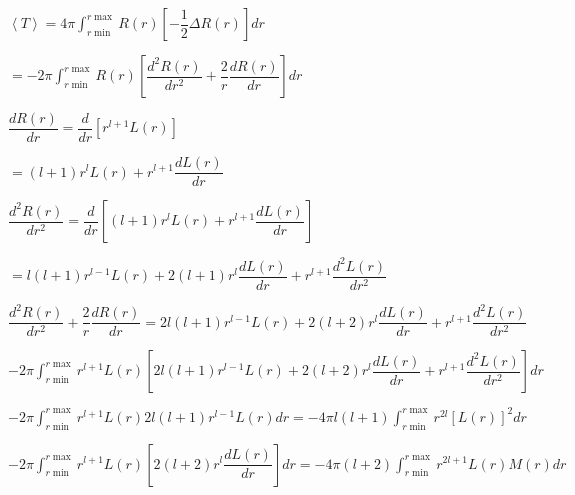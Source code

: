 \documentclass{jarticle}%
\begin{document}
$\left\langle T\right\rangle =4\pi%
{\displaystyle\int\nolimits_{r\min}^{r\max}}
R\left(  r\right)  \left[  -\dfrac{1}{2}\Delta R\left(  r\right)  \right]  dr$

$=-2\pi%
{\displaystyle\int\nolimits_{r\min}^{r\max}}
R\left(  r\right)  \left[  \dfrac{d^{2}R\left(  r\right)  }{dr^{2}}+\dfrac
{2}{r}\dfrac{dR\left(  r\right)  }{dr}\right]  dr$

$\dfrac{dR\left(  r\right)  }{dr}=\dfrac{d}{dr}\left[  r^{l+1}L\left(
r\right)  \right]  $

$=\left(  l+1\right)  r^{l}L\left(  r\right)  +r^{l+1}\dfrac{dL\left(
r\right)  }{dr}$

$\dfrac{d^{2}R\left(  r\right)  }{dr^{2}}=\dfrac{d}{dr}\left[  \left(
l+1\right)  r^{l}L\left(  r\right)  +r^{l+1}\dfrac{dL\left(  r\right)  }%
{dr}\right]  $

$=l\left(  l+1\right)  r^{l-1}L\left(  r\right)  +2\left(  l+1\right)
r^{l}\dfrac{dL\left(  r\right)  }{dr}+r^{l+1}\dfrac{d^{2}L\left(  r\right)
}{dr^{2}}$

$\dfrac{d^{2}R\left(  r\right)  }{dr^{2}}+\dfrac{2}{r}\dfrac{dR\left(
r\right)  }{dr}=2l\left(  l+1\right)  r^{l-1}L\left(  r\right)  +2\left(
l+2\right)  r^{l}\dfrac{dL\left(  r\right)  }{dr}+r^{l+1}\dfrac{d^{2}L\left(
r\right)  }{dr^{2}}$

$-2\pi%
{\displaystyle\int\nolimits_{r\min}^{r\max}}
r^{l+1}L\left(  r\right)  \left[  2l\left(  l+1\right)  r^{l-1}L\left(
r\right)  +2\left(  l+2\right)  r^{l}\dfrac{dL\left(  r\right)  }{dr}%
+r^{l+1}\dfrac{d^{2}L\left(  r\right)  }{dr^{2}}\right]  dr$

$-2\pi%
{\displaystyle\int\nolimits_{r\min}^{r\max}}
r^{l+1}L\left(  r\right)  2l\left(  l+1\right)  r^{l-1}L\left(  r\right)
dr=-4\pi l\left(  l+1\right)
{\displaystyle\int\nolimits_{r\min}^{r\max}}
r^{2l}\left[  L\left(  r\right)  \right]  ^{2}dr$

$-2\pi%
{\displaystyle\int\nolimits_{r\min}^{r\max}}
r^{l+1}L\left(  r\right)  \left[  2\left(  l+2\right)  r^{l}\dfrac{dL\left(
r\right)  }{dr}\right]  dr=-4\pi\left(  l+2\right)
{\displaystyle\int\nolimits_{r\min}^{r\max}}
r^{2l+1}L\left(  r\right)  M\left(  r\right)  dr$
\end{document}
